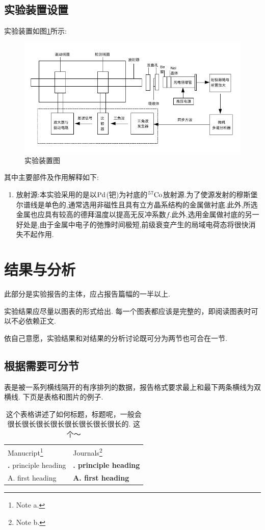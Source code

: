 \documentclass[aps,pre,12pt,preprint,onecolumn,showpacs,showkeys]{revtex4-1}
\begin{document}
\subsection{实验装置设置}
实验装置如图\ref{fig:1}所示:
\begin{figure}[htbp]
    \centering
    \includegraphics[width=\textwidth]{device.jpg}
    \caption{实验装置图}
    \label{fig:1}
\end{figure}
其中主要部件及作用解释如下:
\begin{enumerate}
    \item 放射源:本实验采用的是以$\rm{Pd}$(钯)为衬底的$^{57}\rm{Co}$放射源.为了使源发射的穆斯堡尔谱线是单色的,通常选用非磁性且具有立方晶系结构的金属做衬底.此外,所选金属也应具有较高的德拜温度以提高无反冲系数$f$.此外,选用金属做衬底的另一好处是,由于金属中电子的弛豫时间极短,前级衰变产生的局域电荷态将很快消失不起作用.
\end{enumerate}
\section{结果与分析}
此部分是实验报告的主体，应占报告篇幅的一半以上.\par
实验结果应尽量以图表的形式给出. 每一个图表都应该是完整的，即阅读图表时可以不必依赖正文.\par
依自己意愿，实验结果和对结果的分析讨论既可分为两节也可合在一节.\par
\subsection{根据需要可分节}

表是被一系列横线隔开的有序排列的数据，报告格式要求最上和最下两条横线为双横线. 下页是表格和图片的例子.\par

\begin{table}[t]
\caption{\label{tab:table1}%
这个表格讲述了如何标题，标题呢，一般会很长很长很长很长很长很长很长很长的. 这个～}
\begin{ruledtabular}
\begin{tabular}{ll}
Manucript\footnote{Note a.} & Journals\footnote{Note b.} \\
\colrule
{\bf\uppercase\expandafter{\romannumeral 1}.} principle heading & {\bf\uppercase\expandafter{\romannumeral 1}. principle heading} \\
A. first heading & {\bf A. first heading} \\
\end{tabular}
\end{ruledtabular}
\end{table}
\end{document}
